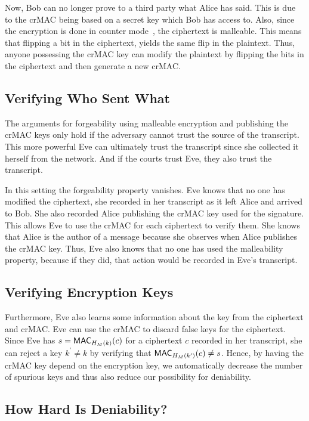 Now, Bob can no longer prove to a third party what Alice has said.
This is due to the \ac{crMAC} being based on a secret key which Bob has access 
to.
Also, since the encryption is done in counter mode~\cite{blockmodes}, the 
ciphertext is malleable.
This means that flipping a bit in the ciphertext, yields the same flip in the 
plaintext.
Thus, anyone possessing the \ac{crMAC} key can modify the plaintext by flipping 
the bits in the ciphertext and then generate a new \ac{crMAC}.

\subsection{Verifying Who Sent What}

The arguments for forgeability using malleable encryption and publishing the 
\ac{crMAC} keys only hold if the adversary cannot trust the source of the 
transcript.
This more powerful Eve can ultimately trust the transcript since she collected 
it herself from the network.
And if the courts trust Eve, they also trust the transcript.

In this setting the forgeability property vanishes.
Eve knows that no one has modified the ciphertext, she recorded in her 
transcript as it left Alice and arrived to Bob.
She also recorded Alice publishing the \ac{crMAC} key used for the signature.
This allows Eve to use the \ac{crMAC} for each ciphertext to verify them.
She knows that Alice is the author of a message because she observes when Alice 
publishes the \ac{crMAC} key.
Thus, Eve also knows that no one has used the malleability property, because if 
they did, that action would be recorded in Eve's transcript.

\subsection{Verifying Encryption Keys}

Furthermore, Eve also learns some information about the key from the ciphertext 
and \ac{crMAC}.
Eve can use the \ac{crMAC} to discard false keys for the ciphertext.
Since Eve has \(s = \operatorname{\mathsf{MAC}}_{H_M( k )}( c )\) for a ciphertext \(c\) recorded in 
her transcript, she can reject a key \(k^\prime\neq k\) by verifying that
\(\operatorname{\mathsf{MAC}}_{H_M( k^\prime )}( c ) \neq s\).
Hence, by having the \ac{crMAC} key depend on the encryption key, we 
automatically decrease the number of spurious keys and thus also reduce our 
possibility for deniability.

\subsection{How Hard Is Deniability?}
\label{sec:HardnessOfDeniability}

